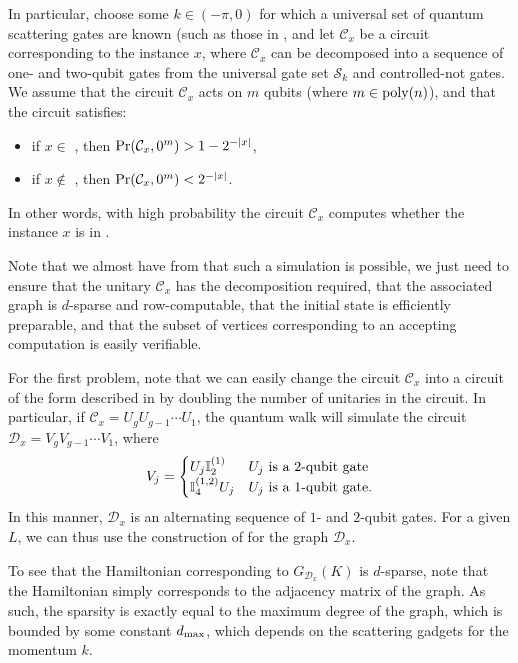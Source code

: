 \documentclass[../thesis-main/thesis-main]{subfiles}
\begin{document}
In particular, choose some $k\in (-\pi,0)$ for which a universal set of quantum scattering gates are known (such as those in , and let $\mathcal{C}_x$ be a circuit corresponding to the \QCircVer{} instance $x$, where $\mathcal{C}_x$ can be decomposed into a sequence of one- and two-qubit gates from the universal gate set $\mathcal{S}_{k}$ and controlled-not gates.  We assume that the circuit $\mathcal{C}_x$ acts on $m$ qubits (where $m\in \operatorname{poly}(n)$), and that the circuit satisfies:
\begin{itemize}
  \item if $x\in$ \QCircVer, then $\operatorname{Pr}(\mathcal{C}_x,0^m) > 1-2^{-|x|}$,
  \item if $x\notin$ \QCircVer, then $\operatorname{Pr}(\mathcal{C}_x,0^m) < 2^{-|x|}$.
\end{itemize}
In other words, with high probability the circuit $\mathcal{C}_x$ computes whether the instance $x$ is in \QCircVer.

Note that we almost have from  that such a simulation is possible, we just need to ensure that the unitary $\mathcal{C}_x$ has the decomposition required, that the associated graph is $d$-sparse and row-computable, that the initial state is efficiently preparable, and that the subset of vertices corresponding to an accepting computation is easily verifiable.

For the first problem, note that we can easily change the circuit $\mathcal{C}_x$ into a circuit of the form described in  by doubling the number of unitaries in the circuit.  In particular, if $\mathcal{C}_x = U_g U_{g-1} \cdots U_{1}$, the quantum walk will simulate the circuit $\mathcal{D}_x = V_g V_{g-1} \cdots V_1$, where 
\begin{align}
  V_j = \begin{cases}
    U_j \mathbb{I}^{(1)}_{2} & U_j \text{ is a 2-qubit gate}\\
    \mathbb{I}_{4}^{(1,2)} U_j & U_j \text{ is a 1-qubit gate}.
  \end{cases}
\end{align}
In this manner, $\mathcal{D}_x$ is an alternating sequence of $1$- and $2$-qubit gates.  For a given $L$, we can thus use the construction of  for the graph $\mathcal{D}_x$.

To see that the Hamiltonian corresponding to $G_{\mathcal{D}_x}(K)$ is $d$-sparse, note that the Hamiltonian simply corresponds to the adjacency matrix of the graph.  As such, the sparsity is exactly equal to the maximum degree of the graph, which is bounded by some constant $d_{\text{max}}$, which depends on the scattering gadgets for the momentum $k$. 
\end{document}

